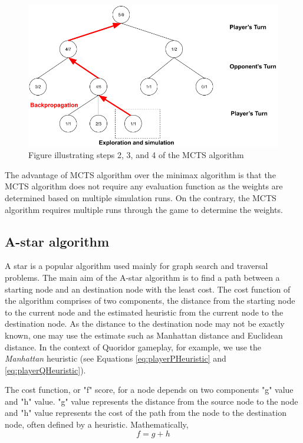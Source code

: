 \begin{figure}[!ht]
    \centering
    \includegraphics[width=\linewidth]{../img/MCTS2.png}
    \caption{Figure illustrating steps 2, 3, and 4 of the MCTS algorithm}
    \label{fig:MCTS2}
\end{figure}

The advantage of \gls{MCTS} algorithm over the minimax algorithm is that the \gls{MCTS} algorithm does not require any evaluation function as the weights are determined based on multiple simulation runs. On the contrary, the \gls{MCTS} algorithm requires multiple runs through the game to determine the weights.





\subsection{A-star algorithm}
A star is a popular algorithm \citep{Hart1968AFormal} used mainly for graph search and traversal problems. The main aim of the A-star algorithm is to find a path between a starting node and an destination node with the least cost. The cost function of the algorithm comprises of two components, the distance from the starting node to the current node and the estimated heuristic from the current node to the destination node. As the distance to the destination node may not be exactly known, one may use the estimate such as Manhattan distance and Euclidean distance. In the context of Quoridor gameplay, for example, we use the \textit{Manhattan} heuristic (see Equations \ref{eq:playerPHeuristic} and \ref{eq:playerQHeuristic}).

The cost function, or "f" score, for a node depends on two components "g" value and "h" value. "g" value represents the distance from the source node to the node and "h" value represents the cost of the path from the node to the destination node, often defined by a heuristic. Mathematically,
\begin{equation}
    f = g + h
\end{equation}